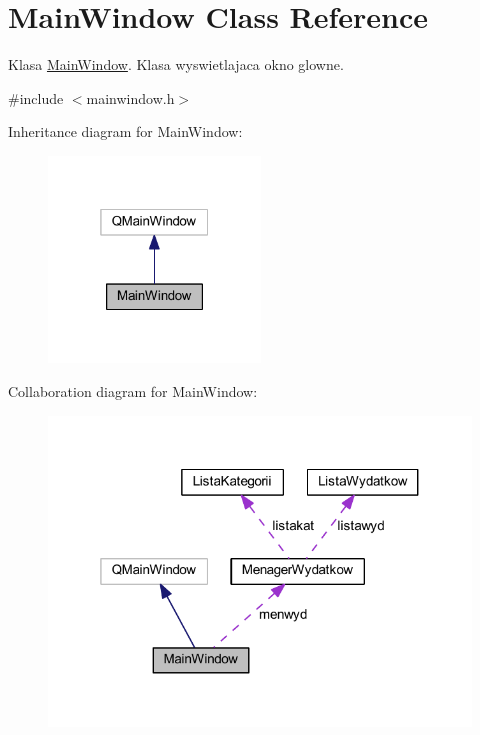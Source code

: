 \hypertarget{class_main_window}{}\section{Main\+Window Class Reference}
\label{class_main_window}


Klasa \hyperlink{class_main_window}{Main\+Window}. Klasa wyswietlajaca okno glowne.  




{\ttfamily \#include $<$mainwindow.\+h$>$}



Inheritance diagram for Main\+Window\+:\nopagebreak
\begin{figure}[H]
\begin{center}
\leavevmode
\includegraphics[width=160pt]{class_main_window__inherit__graph}
\end{center}
\end{figure}


Collaboration diagram for Main\+Window\+:\nopagebreak
\begin{figure}[H]
\begin{center}
\leavevmode
\includegraphics[width=319pt]{class_main_window__coll__graph}
\end{center}
\end{figure}
